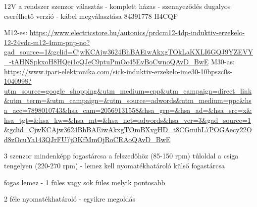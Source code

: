 \documentclass{article}
\begin{document}
	
	12V a rendszer
	szenzor választás - komplett házas - szennyeződés
	dugalyos cserélhető verzió - kábel megválasztása
	84391778 H4CQF
	
	M12-es: \url{https://www.electricstore.hu/autonics/prdcm12-4dp-induktiv-erzekelo-12-24vdc-m12-4mm-pnp-no?gad_source=1&gclid=CjwKCAjw3624BhBAEiwAkxgTOkLaKXLI6GQJ9YZEVY_-tAHNSpkxoH8HQei1cQJeC9ptuPmOc45EvBoCwnoQAvD_BwE}
	M30-as: \url{https://www.ipari-elektronika.com/sick-induktiv-erzekelo-ime30-10bpszc0s-1040998?utm_source=google_shopping&utm_medium=cpp&utm_campaign=direct_link&utm_term=&utm_campaign=&utm_source=adwords&utm_medium=ppc&hsa_acc=7898010743&hsa_cam=20569131558&hsa_grp=&hsa_ad=&hsa_src=x&hsa_tgt=&hsa_kw=&hsa_mt=&hsa_net=adwords&hsa_ver=3&gad_source=1&gclid=CjwKCAjw3624BhBAEiwAkxgTOmBXvgHD_t8CGmibL7POGAecy22Od8zOcuYa143QJrFU7jOKfMmOjRoCRAoQAvD_BwE}
	
	
	3 szenzor mindenképp
	fogastárcsa a felszedőhöz (85-150 rpm)
	túloldal a csiga tengelyen (220-270 rpm) - lemez kell
	nyomatékhatároló külső fogastárcsa
	
	fogas lemez - 1 füles vagy sok füles melyik pontosabb
	
	2 féle nyomatékhatároló - egyikre megoldás
	
	
	
	
\end{document}
